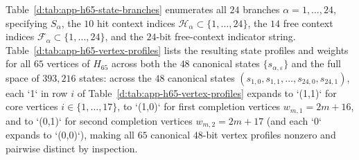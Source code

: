 \documentclass[aps,pra,reprint,superscriptaddress,longbibliography,nofootinbib,floatfix,10pt]{revtex4-2}
\theoremstyle{definition}
\begin{document}
Table~\ref{d:tab:app-h65-state-branches} enumerates all $24$ branches $\alpha=1,\ldots,24$, specifying $S_\alpha$, the $10$ hit context indices $\mathcal{H}_\alpha\subset\{1,\ldots,24\}$, the $14$ free context indices $\mathcal{F}_\alpha\subset\{1,\ldots,24\}$, and the $24$-bit free-context indicator string. Table~\ref{d:tab:app-h65-vertex-profiles} lists the resulting state profiles and weights for all $65$ vertices of $H_{65}$ across both the $48$ canonical states $\{s_{\alpha,\varepsilon}\}$ and the full space of $393{,}216$ states: across the $48$ canonical states $(s_{1,0},s_{1,1},\ldots,s_{24,0},s_{24,1})$, each `1` in row $i$ of Table~\ref{d:tab:app-h65-vertex-profiles} expands to `(1,1)` for core vertices $i\in\{1,\ldots,17\}$, to `(1,0)` for first completion vertices $w_{m,1}=2m+16$, and to `(0,1)` for second completion vertices $w_{m,2}=2m+17$ (and each `0` expands to `(0,0)`), making all $65$ canonical $48$-bit vertex profiles nonzero and pairwise distinct by inspection.
\end{document}

